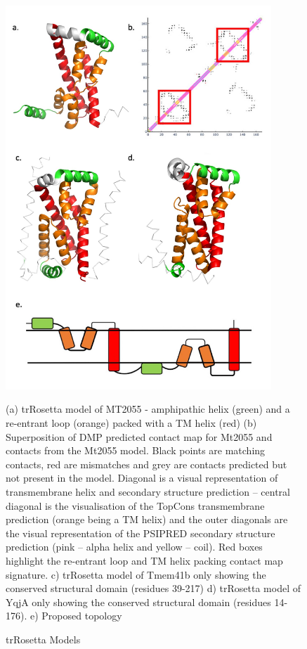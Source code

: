 \begin{figure}[th!]
    \centering
    \includegraphics[width=100mm, scale =0.5]{Results/fig4.jpg}
    \caption{trRosetta Models}
    \label{fig:trros_models}
    \small
    (a) trRosetta model of MT2055 - amphipathic helix (green) and a re-entrant loop (orange) packed with a TM helix (red) (b) Superposition of DMP predicted contact map for Mt2055 and contacts from the Mt2055 model. Black points are matching contacts, red are mismatches and grey are contacts predicted but not present in the model. Diagonal is a visual representation of transmembrane helix and secondary structure prediction – central diagonal is the visualisation of the TopCons transmembrane prediction (orange being a TM helix) and the outer diagonals are the visual representation of the PSIPRED secondary structure prediction (pink – alpha helix and yellow – coil). Red boxes highlight the re-entrant loop and TM helix packing contact map signature. c) trRosetta model of Tmem41b only showing the conserved structural domain (residues 39-217) d) trRosetta model of YqjA only showing the conserved structural domain (residues 14-176). e) Proposed topology 
\end{figure}

